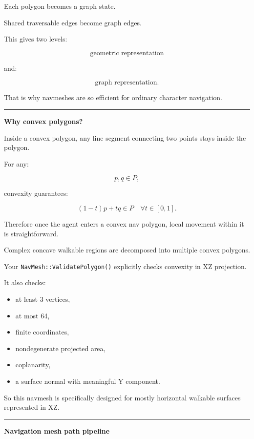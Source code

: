 Each polygon becomes a graph state.

Shared traversable edges become graph edges.

This gives two levels:

\[
\text{geometric representation}
\]

and:

\[
\text{graph representation}.
\]

That is why navmeshes are so efficient for ordinary character navigation.

\begin{center}\rule{0.5\linewidth}{0.5pt}\end{center}

\textbf{Why convex polygons?}

Inside a convex polygon, any line segment connecting two points stays inside the polygon.

For any:

\[
p,q\in P,
\]

convexity guarantees:

\[
(1-t)p+tq\in P
\quad
\forall t\in[0,1].
\]

Therefore once the agent enters a convex nav polygon, local movement within it is straightforward.

Complex concave walkable regions are decomposed into multiple convex polygons.

Your \texttt{NavMesh::ValidatePolygon()} explicitly checks convexity in XZ projection.

It also checks:

\begin{itemize}
\tightlist
\item
  at least 3 vertices,
\item
  at most 64,
\item
  finite coordinates,
\item
  nondegenerate projected area,
\item
  coplanarity,
\item
  a surface normal with meaningful Y component.
\end{itemize}

So this navmesh is specifically designed for mostly horizontal walkable surfaces represented in XZ.

\begin{center}\rule{0.5\linewidth}{0.5pt}\end{center}

\textbf{Navigation mesh path pipeline}

